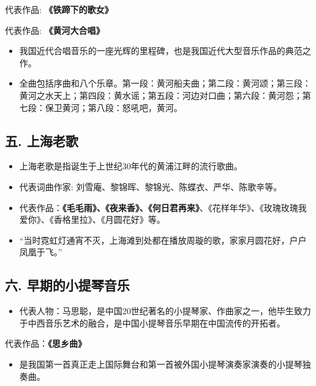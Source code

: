 \documentclass[
]{article}
\providecommand{\tightlist}{%
  \setlength{\itemsep}{0pt}\setlength{\parskip}{0pt}}
\begin{document}
代表作品: \textbf{《铁蹄下的歌女》}

代表作品: \textbf{《黄河大合唱》}

\begin{itemize}
\tightlist
\item
  我国近代合唱音乐的一座光辉的里程碑，也是我国近代大型音乐作品的典范之作。
\item
  全曲包括序曲和八个乐章。第一段：黄河船夫曲；第二段：黄河颂；第三段：黄河之水天上；第四段：黄水谣；第五段：河边对口曲；第六段：黄河怨；第七段：保卫黄河；第八段：怒吼吧，黄河。
\end{itemize}

\subsection{五. 上海老歌}\label{ux4e94.-ux4e0aux6d77ux8001ux6b4c}

\begin{itemize}
\tightlist
\item
  上海老歌是指诞生于上世纪30年代的黄浦江畔的流行歌曲。
\item
  代表词曲作家: 刘雪庵、黎锦晖、黎锦光、陈蝶衣、严华、陈歌辛等。
\item
  代表作品：\textbf{《毛毛雨》、《夜来香》、《何日君再来》}、《花样年华》、《玫瑰玫瑰我爱你》、《香格里拉》、《月圆花好》等。
\item
  ``当时霓虹灯通宵不灭，上海滩到处都在播放周璇的歌，家家月圆花好，户户凤凰于飞。''
\end{itemize}

\subsection{六.
早期的小提琴音乐}\label{ux516d.-ux65e9ux671fux7684ux5c0fux63d0ux7434ux97f3ux4e50}

\begin{itemize}
\tightlist
\item
  代表人物：马思聪，是中国20世纪著名的小提琴家、作曲家之一，他毕生致力于中西音乐艺术的融合，是中国小提琴音乐早期在中国流传的开拓者。
\end{itemize}

代表作品：\textbf{《思乡曲》}

\begin{itemize}
\tightlist
\item
  是我国第一首真正走上国际舞台和第一首被外国小提琴演奏家演奏的小提琴独奏曲。
\end{itemize}
\end{document}
